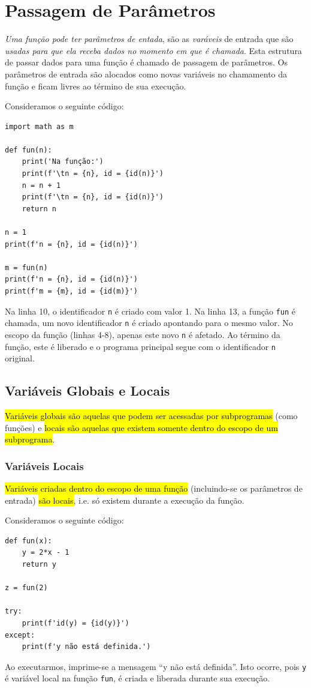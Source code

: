 \section{Passagem de Parâmetros}

\emph{Uma função pode ter parâmetros de entada}, são as \emph{varáveis} de entrada que são \emph{usadas para que ela receba dados no momento em que é chamada}. Esta estrutura de passar dados para uma função é chamado de passagem de parâmetros. Os parâmetros de entrada são alocados como novas variáveis no chamamento da função e ficam livres ao término de sua execução.

\begin{ex}
  Consideramos o seguinte código:
\begin{lstlisting}
import math as m

def fun(n):
    print('Na função:')
    print(f'\tn = {n}, id = {id(n)}')
    n = n + 1
    print(f'\tn = {n}, id = {id(n)}')
    return n

n = 1
print(f'n = {n}, id = {id(n)}')

m = fun(n)
print(f'n = {n}, id = {id(n)}')
print(f'm = {m}, id = {id(m)}')
\end{lstlisting}
  Na linha 10, o identificador \lstinline+n+ é criado com valor 1. Na linha 13, a função \lstinline+fun+ é chamada, um novo identificador \lstinline+n+ é criado apontando para o mesmo valor. No escopo da função (linhas 4-8), apenas este novo \lstinline+n+ é afetado. Ao término da função, este é liberado e o programa principal segue com o identificador \lstinline+n+ original.
\end{ex}

\subsection{Variáveis Globais e Locais}

\hl{Variáveis globais são aquelas que podem ser acessadas por subprogramas} (como funções) e \hl{locais são aquelas que existem somente dentro do escopo de um subprograma}.

\subsubsection{Variáveis Locais}

\hl{Variáveis criadas dentro do escopo de uma função} (incluindo-se os parâmetros de entrada) \hl{são locais}, i.e. só existem durante a execução da função.

\begin{ex}
  Consideramos o seguinte código:
\begin{lstlisting}
def fun(x):
    y = 2*x - 1
    return y

z = fun(2)

try:
    print(f'id(y) = {id(y)}')
except:
    print(f'y não está definida.')
\end{lstlisting}
  Ao executarmos, imprime-se a mensagem ``y não está definida''. Isto ocorre, pois \lstinline+y+ é variável local na função \lstinline+fun+, é criada e liberada durante sua execução.
\end{ex}

